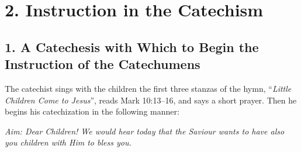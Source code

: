 \section{2. Instruction in the Catechism}

\subsection[1. A Catechesis to Begin Instruction]{1. A Catechesis with Which to Begin the Instruction of the Catechumens}

The catechist sings with the children the first three stanzas of the hymn, “\emph{Little Children Come to Jesus}”, reads Mark 10:13–16, and says a short prayer. Then he begins his catechization in the following manner:

\emph{Aim: Dear Children! We would hear today that the Saviour wants to have also you children with Him to bless you.}

